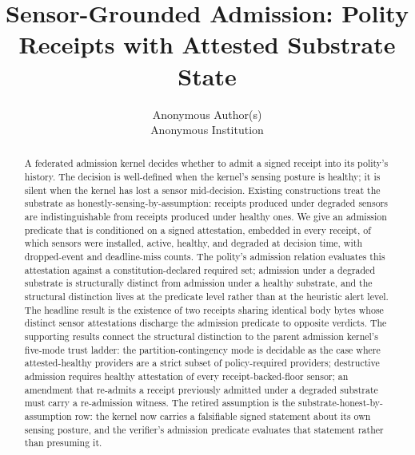 \documentclass[letterpaper,twocolumn,10pt]{article}
\date{}
\title{\Large \bf Sensor-Grounded Admission: Polity Receipts with Attested Substrate State}
\author{
{\rm Anonymous Author(s)}\\
Anonymous Institution
}
\begin{document}
\maketitle

\begin{abstract}
A federated admission kernel decides whether to admit a signed receipt into its polity's history. The decision is well-defined when the kernel's sensing posture is healthy; it is silent when the kernel has lost a sensor mid-decision. Existing constructions treat the substrate as honestly-sensing-by-assumption: receipts produced under degraded sensors are indistinguishable from receipts produced under healthy ones. We give an admission predicate that is conditioned on a signed attestation, embedded in every receipt, of which sensors were installed, active, healthy, and degraded at decision time, with dropped-event and deadline-miss counts. The polity's admission relation evaluates this attestation against a constitution-declared required set; admission under a degraded substrate is structurally distinct from admission under a healthy substrate, and the structural distinction lives at the predicate level rather than at the heuristic alert level. The headline result is the existence of two receipts sharing identical body bytes whose distinct sensor attestations discharge the admission predicate to opposite verdicts. The supporting results connect the structural distinction to the parent admission kernel's five-mode trust ladder: the partition-contingency mode is decidable as the case where attested-healthy providers are a strict subset of policy-required providers; destructive admission requires healthy attestation of every receipt-backed-floor sensor; an amendment that re-admits a receipt previously admitted under a degraded substrate must carry a re-admission witness. The retired assumption is the substrate-honest-by-assumption row: the kernel now carries a falsifiable signed statement about its own sensing posture, and the verifier's admission predicate evaluates that statement rather than presuming it.
\end{abstract}















\appendix


\end{document}
